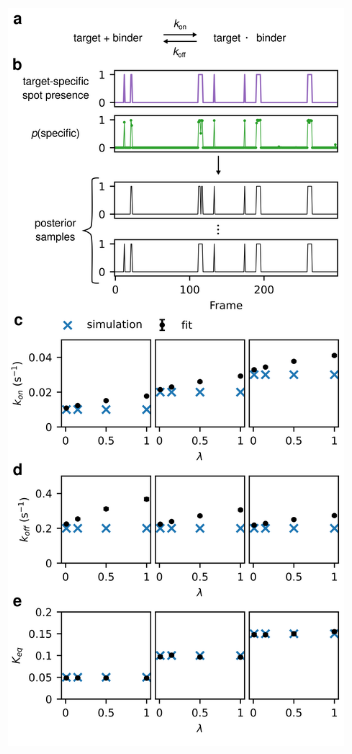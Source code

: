 \begin{figure}[h]
\centering
\includegraphics[width=89mm]{figures/figure6/figure6.png}

\end{figure}
